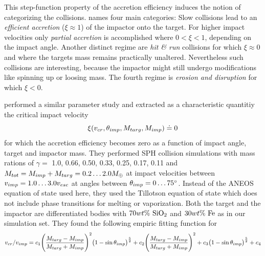 This step-function property of the accretion efficiency induces the notion of categorizing the collisions. \cite{Asphaug:2010p3539} names four main categories: Slow collisions lead to an \emph{efficient accretion} ($\xi \approx 1$) of the impactor onto the target. For higher impact velocities only \emph{partial accretion} is accomplished where $0 < \xi <1$, depending on the impact angle. Another distinct regime are \emph{hit \& run} collisions \citep{Asphaug:2006p3729} for which $\xi \approx 0$ and where the targets mass remains practically unaltered. Nevertheless such collisions are interesting, because the impactor might still undergo modifications like spinning up or loosing mass. The fourth regime is \emph{erosion and disruption} for which $\xi < 0$.

\cite{2010ApJ...714L..21K} performed a similar parameter study and extracted as a characteristic quantitiy the critical impact velocity
\begin{equation}
\xi(v_{cr}, \theta_{imp}, M_{targ}, M_{imp}) \doteq 0
\end{equation}
for which the accretion efficiency becomes zero as a function of impact angle, target and impactor mass. They performed SPH collision simulations with mass rations of $\gamma =$ 1.0, 0.66, 0.50, 0.33, 0.25, 0.17, 0.11 and $M_{tot} = M_{imp} + M_{targ} = 0.2 \dots 2.0 M_{\oplus}$ at impact velocities between $v_{imp} = 1.0 \dots 3.0 v_{esc}$ at angles between $\theta_{imp} = 0 \dots 75 ^\circ$. Instead of the ANEOS equation of state used here, they used the Tillotson equation of state \cite{Melosh:1989p996} which does not include phase transitions for melting or vaporization. Both the target and the impactor are differentiated bodies with $70 wt\mathrm{\%}~\mathrm{SiO}_2$ and $30 wt\mathrm{\%}~\mathrm{Fe}$ as in our \css simulation set. They found the following empiric fitting function for
\begin{equation}
\label{ch03_eq002}
v_{cr} / v_{imp} = c_1 \Bigg( \frac{M_{targ} - M_{imp}}{M_{targ} + M_{imp}} \Bigg)^2 \big( 1 - \sin{\theta_{imp}} \big)^\frac{5}{2} + c_2 \Bigg( \frac{M_{targ} - M_{imp}}{M_{targ} + M_{imp}} \Bigg)^2 + c_3 \big( 1 - \sin{\theta_{imp}} \big)^\frac{5}{2}  + c_4
\end{equation}
